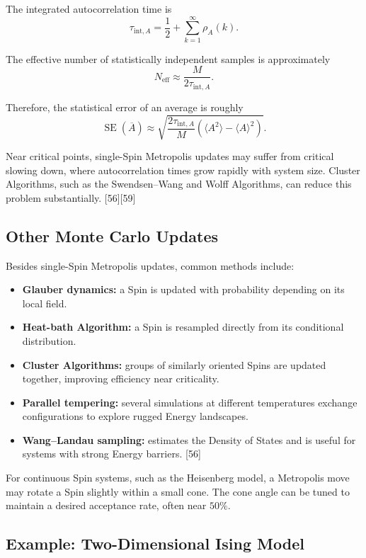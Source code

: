 \documentclass[a4paper, 10pt, onepage]{elegantbook}
\begin{document}
{The integrated autocorrelation time is
\[
\tau_{\mathrm{int},A}
=
\frac{1}{2}
+
\sum_{k=1}^{\infty}\rho_A(k).
\]

The effective number of statistically independent samples is approximately
\[
N_{\mathrm{eff}}
\approx
\frac{M}{2\tau_{\mathrm{int},A}}.
\]

Therefore, the statistical error of an average is roughly
\[
\operatorname{SE}(\overline A)
\approx
\sqrt{
\frac{2\tau_{\mathrm{int},A}}{M}
\left(
\langle A^2\rangle-\langle A\rangle^2
\right)
}.
\]

Near critical points, single-Spin Metropolis updates may suffer from critical
slowing down, where autocorrelation times grow rapidly with system size.
Cluster Algorithms, such as the Swendsen--Wang and Wolff Algorithms, can reduce
this problem substantially. [56][59]

\subsection{Other Monte Carlo Updates}

Besides single-Spin Metropolis updates, common methods include:

\begin{itemize}
\item \textbf{Glauber dynamics:} a Spin is updated with probability depending
on its local field.
\item \textbf{Heat-bath Algorithm:} a Spin is resampled directly from its
conditional distribution.
\item \textbf{Cluster Algorithms:} groups of similarly oriented Spins are
updated together, improving efficiency near criticality.
\item \textbf{Parallel tempering:} several simulations at different
temperatures exchange configurations to explore rugged Energy landscapes.
\item \textbf{Wang--Landau sampling:} estimates the Density of States and is
useful for systems with strong Energy barriers. [56]
\end{itemize}

For continuous Spin systems, such as the Heisenberg model, a Metropolis move may
rotate a Spin slightly within a small cone. The cone angle can be tuned to
maintain a desired acceptance rate, often near \(50\%\).

\subsection{Example: Two-Dimensional Ising Model}

}
\end{document}
